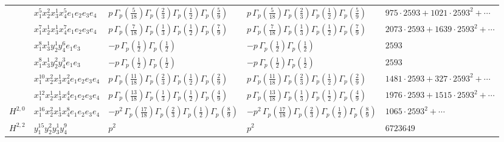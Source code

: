 \documentclass[11pt]{article}
\begin{document}
\begin{table}[ht]
{\begin{tabular}{@{}lllll@{}}
 & $x_{1}^{5} x_{2}^{2} x_{3}^{1} x_{4}^{5}  e_{1} e_{2} e_{3} e_{4}$ & $p \, \Gamma_p \left( \frac{5}{18} \right) \Gamma_p \left( \frac{2}{3} \right) \Gamma_p \left( \frac{1}{2} \right) \Gamma_p \left( \frac{5}{9} \right)$ & $p \, \Gamma_p \left( \frac{5}{18} \right) \Gamma_p \left( \frac{2}{3} \right) \Gamma_p \left( \frac{1}{2} \right) \Gamma_p \left( \frac{5}{9} \right)$ & $975{\cdot}2593{+}1021{\cdot}2593^{2}{+}\cdots$ \\
 & $x_{1}^{7} x_{2}^{1} x_{3}^{1} x_{4}^{7}  e_{1} e_{2} e_{3} e_{4}$ & $p \, \Gamma_p \left( \frac{7}{18} \right) \Gamma_p \left( \frac{1}{3} \right) \Gamma_p \left( \frac{1}{2} \right) \Gamma_p \left( \frac{7}{9} \right)$ & $p \, \Gamma_p \left( \frac{7}{18} \right) \Gamma_p \left( \frac{1}{3} \right) \Gamma_p \left( \frac{1}{2} \right) \Gamma_p \left( \frac{7}{9} \right)$ & $2073{\cdot}2593{+}1639{\cdot}2593^{2}{+}\cdots$ \\
 & $x_{1}^{8} x_{3}^{1} y_{2}^{1} y_{4}^{6} e_{1} e_{3}$ & $- p \, \Gamma_p \left( \frac{1}{2} \right) \Gamma_p \left( \frac{1}{2} \right)$ & $- p \, \Gamma_p \left( \frac{1}{2} \right) \Gamma_p \left( \frac{1}{2} \right)$ & $2593$ \\
 & $x_{1}^{8} x_{3}^{1} y_{2}^{2} y_{4}^{3} e_{1} e_{3}$ & $- p \, \Gamma_p \left( \frac{1}{2} \right) \Gamma_p \left( \frac{1}{2} \right)$ & $- p \, \Gamma_p \left( \frac{1}{2} \right) \Gamma_p \left( \frac{1}{2} \right)$ & $2593$ \\
 & $x_{1}^{10} x_{2}^{2} x_{3}^{1} x_{4}^{2}  e_{1} e_{2} e_{3} e_{4}$ & $p \, \Gamma_p \left( \frac{11}{18} \right) \Gamma_p \left( \frac{2}{3} \right) \Gamma_p \left( \frac{1}{2} \right) \Gamma_p \left( \frac{2}{9} \right)$ & $p \, \Gamma_p \left( \frac{11}{18} \right) \Gamma_p \left( \frac{2}{3} \right) \Gamma_p \left( \frac{1}{2} \right) \Gamma_p \left( \frac{2}{9} \right)$ & $1481{\cdot}2593{+}327{\cdot}2593^{2}{+}\cdots$ \\
 & $x_{1}^{12} x_{2}^{1} x_{3}^{1} x_{4}^{4}  e_{1} e_{2} e_{3} e_{4}$ & $p \, \Gamma_p \left( \frac{13}{18} \right) \Gamma_p \left( \frac{1}{3} \right) \Gamma_p \left( \frac{1}{2} \right) \Gamma_p \left( \frac{4}{9} \right)$ & $p \, \Gamma_p \left( \frac{13}{18} \right) \Gamma_p \left( \frac{1}{3} \right) \Gamma_p \left( \frac{1}{2} \right) \Gamma_p \left( \frac{4}{9} \right)$ & $1976{\cdot}2593{+}1515{\cdot}2593^{2}{+}\cdots$ \\
\midrule
$H^{2,0}$ & $x_{1}^{16} x_{2}^{2} x_{3}^{1} x_{4}^{8}  e_{1} e_{2} e_{3} e_{4}$ & $- p^{2} \, \Gamma_p \left( \frac{17}{18} \right) \Gamma_p \left( \frac{2}{3} \right) \Gamma_p \left( \frac{1}{2} \right) \Gamma_p \left( \frac{8}{9} \right)$ & $- p^{2} \, \Gamma_p \left( \frac{17}{18} \right) \Gamma_p \left( \frac{2}{3} \right) \Gamma_p \left( \frac{1}{2} \right) \Gamma_p \left( \frac{8}{9} \right)$ & $1065{\cdot}2593^{2}{+}\cdots$ \\
\midrule
$H^{2,2}$ & $y_{1}^{15} y_{2}^{2} y_{3}^{1} y_{4}^{9}$ & $p^{2} \,$ & $p^{2} \,$ & $6723649$ \\
\bottomrule
\end{tabular}
}
\renewcommand{\arraystretch}{1.0}
\end{table}
\end{document}
